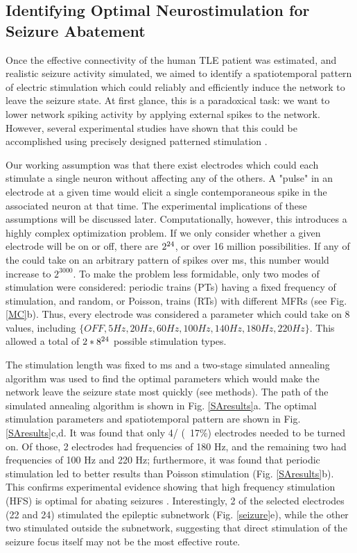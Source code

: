 \documentclass[11pt,a4paper,final]{article}
\begin{document}
    \subsection{Identifying Optimal Neurostimulation for Seizure Abatement}

Once the effective connectivity of the human TLE patient was estimated, and realistic seizure activity simulated, we aimed to identify a spatiotemporal pattern of electric stimulation which could reliably and efficiently induce the network to leave the seizure state.
At first glance, this is a paradoxical task: we want to lower network spiking activity by applying external spikes to the network.
However, several experimental studies have shown that this could be accomplished using precisely designed patterned stimulation \citep{durand01,heck14}.

Our working assumption was that there exist \nn{} electrodes which could each stimulate a single neuron without affecting any of the others.
A "pulse" in an electrode at a given time would elicit a single contemporaneous spike in the associated neuron at that time.
The experimental implications of these assumptions will be discussed later.
Computationally, however, this introduces a highly complex optimization problem.
If we only consider whether a given electrode will be on or off, there are $2^{24{}}$, or over 16 million possibilities.
If any of the \nn{} could take on an arbitrary pattern of spikes over \len{} ms, this number would increase to $2^{3000}$.
To make the problem less formidable, only two modes of stimulation were considered: periodic trains (PTs) having a fixed frequency of stimulation, and random, or Poisson, trains (RTs) with different MFRs (see Fig. \ref{MC}b).
Thus, every electrode was considered a parameter which could take on 8 values, including $\{OFF, 5 Hz, 20 Hz, 60 Hz, 100 Hz, 140 Hz, 180 Hz, 220 Hz\}$.
This allowed a total of $2*8^{24{}}$ possible stimulation types.

The stimulation length was fixed to \len{} ms and a two-stage simulated annealing algorithm was used to find the optimal parameters which would make the network leave the seizure state most quickly (see methods).
The path of the simulated annealing algorithm is shown in Fig. \ref{SAresults}a.
The optimal stimulation parameters and spatiotemporal pattern are shown in Fig. \ref{SAresults}c,d.
It was found that only 4/\nn{} (~17\%) electrodes needed to be turned on.
Of those, 2 electrodes had frequencies of 180 Hz, and the remaining two had frequencies of 100 Hz and 220 Hz; furthermore, it was found that periodic stimulation led to better results than Poisson stimulation (Fig. \ref{SAresults}b).
This confirms experimental evidence showing that high frequency stimulation (HFS) is optimal for abating seizures \citep{durand01}.
Interestingly, 2 of the selected electrodes (22 and 24) stimulated the epileptic subnetwork (Fig. \ref{seizure}e), while the other two stimulated outside the subnetwork, suggesting that direct stimulation of the seizure focus itself may not be the most effective route.
\end{document}
